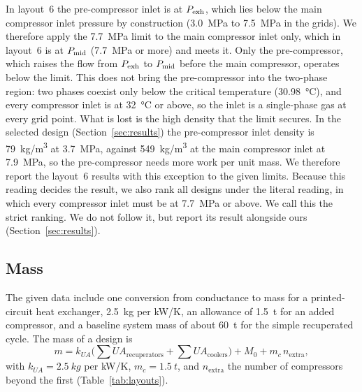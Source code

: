 In layout~6 the pre-compressor inlet is at $P_\mathrm{exh}$, which lies below the main compressor inlet pressure by construction (\SI{3.0}{MPa} to \SI{7.5}{MPa} in the grids). We therefore apply the \SI{7.7}{MPa} limit to the main compressor inlet only, which in layout~6 is at $P_\mathrm{mid}$ (\SI{7.7}{MPa} or more) and meets it. Only the pre-compressor, which raises the flow from $P_\mathrm{exh}$ to $P_\mathrm{mid}$ before the main compressor, operates below the limit. This does not bring the pre-compressor into the two-phase region: two phases coexist only below the critical temperature (\SI{30.98}{\celsius}), and every compressor inlet is at \SI{32}{\celsius} or above, so the inlet is a single-phase gas at every grid point. What is lost is the high density that the limit secures. In the selected design (Section~\ref{sec:results}) the pre-compressor inlet density is \SI{79}{kg/m^3} at \SI{3.7}{MPa}, against \SI{549}{kg/m^3} at the main compressor inlet at \SI{7.9}{MPa}, so the pre-compressor needs more work per unit mass. We therefore report the layout~6 results with this exception to the given limits. Because this reading decides the result, we also rank all designs under the literal reading, in which every compressor inlet must be at \SI{7.7}{MPa} or above. We call this the strict ranking. We do not follow it, but report its result alongside ours (Section~\ref{sec:results}).


\subsection{Mass}
The given data include one conversion from conductance to mass for a printed-circuit heat exchanger, \SI{2.5}{kg} per \si{kW/K}, an allowance of \SI{1.5}{t} for an added compressor, and a baseline system mass of about \SI{60}{t} for the simple recuperated cycle. The mass of a design is
\begin{equation}
m = k_{UA}\Big(\sum UA_\mathrm{recuperators} + \sum UA_\mathrm{coolers}\Big) + M_0 + m_c\,n_\mathrm{extra},
\end{equation}
with $k_{UA} = \SI{2.5}{kg}$ per \si{kW/K}, $m_c = \SI{1.5}{t}$, and $n_\mathrm{extra}$ the number of compressors beyond the first (Table~\ref{tab:layouts}).

